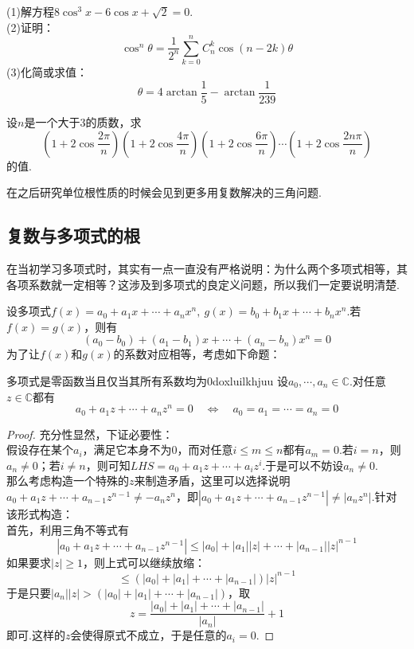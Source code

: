 \documentclass[lang=cn, zihao=5]{elegantbook}
\newcommand{\ssb}[1]{\left( #1 \right)}
\newcommand{\C}{\mathbb{C}}
\begin{document}
\begin{example}
	(1)解方程$8\cos ^3 x-6\cos x+\sqrt{2}=0$. \\
	(2)证明：$$\cos ^n \theta = \frac{1}{2^n} \sum_{k=0}^{n}C_n^k \cos (n-2k)\theta$$
	(3)化简或求值：$$\theta = 4\arctan \frac{1}{5} - \arctan \frac{1}{239}$$
\end{example}

\begin{example}
	设$n$是一个大于$3$的质数，求$$\ssb{1+2\cos \frac{2\pi}{n}} \ssb{1+2\cos \frac{4\pi}{n}} \ssb{1+2\cos \frac{6\pi}{n}} \cdots \ssb{1+2\cos \frac{2n\pi}{n}}$$
	的值.
\end{example}

在之后研究单位根性质的时候会见到更多用复数解决的三角问题.

\subsection{复数与多项式的根}

在当初学习多项式时，其实有一点一直没有严格说明：为什么两个多项式相等，其各项系数就一定相等？这涉及到多项式的良定义问题，所以我们一定要说明清楚.

设多项式$f(x)=a_0 + a_1x + \cdots + a_nx^n,~g(x)=b_0 + b_1x + \cdots + b_nx^n$.若$f(x)=g(x)$，则有$$(a_0-b_0) + (a_1-b_1)x + \cdots + (a_n-b_n)x^n = 0$$
为了让$f(x)$和$g(x)$的系数对应相等，考虑如下命题：

\begin{proposition}{多项式是零函数当且仅当其所有系数均为$0$}{doxluilkhjuu}
	设$a_0, \cdots ,a_n \in \C$.对任意$z \in \C$都有$$a_0 + a_1z + \cdots + a_nz^n =0 \quad \Longleftrightarrow \quad a_0=a_1=\cdots =a_n=0$$
\end{proposition}
\begin{proof}
	充分性显然，下证必要性：\\ 
	假设存在某个$a_i$，满足它本身不为$0$，而对任意$i \leq m \leq n$都有$a_m=0$.若$i=n$，则$a_n \neq 0$；若$i \neq n$，则可知$LHS = a_0 + a_1z + \cdots + a_iz^i$.于是可以不妨设$a_n \neq 0$. \\
	那么考虑构造一个特殊的$z$来制造矛盾，这里可以选择说明$a_0 + a_1z + \cdots + a_{n-1}z^{n-1} \neq -a_nz^n$，即$|a_0 + a_1z + \cdots + a_{n-1}z^{n-1}| \neq |a_nz^n|$.针对该形式构造： \\
	首先，利用三角不等式有$$|a_0 + a_1z + \cdots + a_{n-1}z^{n-1}| \leq |a_0| + |a_1||z| + \cdots + |a_{n-1}||z|^{n-1}$$
	如果要求$|z| \geq 1$，则上式可以继续放缩：$$\leq (|a_0|+|a_1|+\cdots +|a_{n-1}|) |z|^{n-1}$$
	于是只要$|a_n||z| > (|a_0|+|a_1|+\cdots +|a_{n-1}|)$，取$$z = \frac{|a_0|+|a_1|+\cdots +|a_{n-1}|}{|a_n|} + 1$$
	即可.这样的$z$会使得原式不成立，于是任意的$a_i=0$.
\end{proof}
\end{document}
